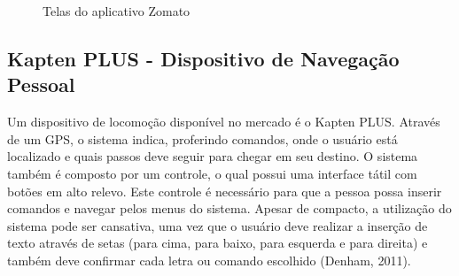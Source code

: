 \begin{figure}[H]
    \centering
    \caption[Ferramenta Zomato]{Telas do aplicativo Zomato}
        \qquad
        \qquad
\end{figure}

\subsection{Kapten PLUS - Dispositivo de Navegação Pessoal}
Um dispositivo de locomoção disponível no mercado é o Kapten PLUS. Através de um GPS, o sistema indica, proferindo comandos, onde o usuário está localizado e quais passos deve seguir para chegar em seu destino. O sistema também é composto por um controle, o qual possui uma interface tátil com botões em alto relevo. Este controle é necessário para que a pessoa possa inserir comandos e navegar pelos menus do sistema. Apesar de compacto, a utilização do sistema pode ser cansativa, uma vez que o usuário deve realizar a inserção de texto através de setas (para cima, para baixo, para esquerda e para direita) e também deve confirmar cada letra ou comando escolhido (Denham, 2011)\nocite{KAPTEN}.

